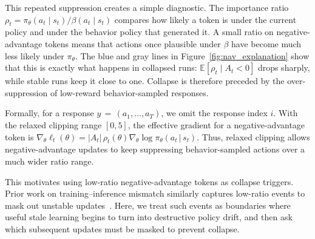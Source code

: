 This repeated suppression creates a simple diagnostic. The importance ratio
$\rho_t=\pi_\theta(a_t\mid s_t)/\beta(a_t\mid s_t)$ compares how likely a token
is under the current policy and under the behavior policy that generated it. A
small ratio on negative-advantage tokens means that actions once plausible under
$\beta$ have become much less likely under $\pi_\theta$. The blue and gray lines in Figure~\ref{fig:nav_explanation} 
show that this is exactly what happens in collapsed runs:
$\mathbb{E}[\rho_t\mid A_t<0]$ drops sharply, while stable runs keep it close to
one. Collapse is therefore preceded by the over-suppression of low-reward behavior-sampled responses.

Formally, for a response $y$\,$=$\,$(a_1,\ldots,a_T)$, we omit the response index $i$.
With the relaxed clipping range $[0,5]$, the effective gradient for a
negative-advantage token is
$
    \nabla_\theta \ell_t(\theta)
    =
    |A_t|\,\rho_t(\theta)
    \nabla_\theta \log \pi_\theta(a_t\,|\, s_t).
$
Thus, relaxed clipping allows negative-advantage updates to keep suppressing
behavior-sampled actions over a much wider ratio range.

This motivates using low-ratio negative-advantage tokens as collapse triggers.
Prior work on training--inference mismatch similarly captures low-ratio events to
mask out unstable updates~\cite{liu-li-2025-rl-collapse}. Here, we treat such events
as boundaries where useful stale learning begins to turn into destructive policy
drift, and then ask which subsequent updates must be masked to prevent collapse.




